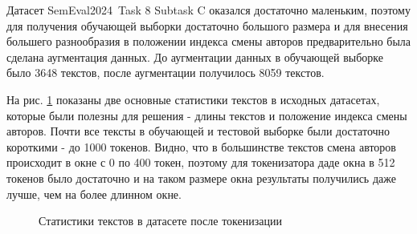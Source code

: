 Датасет SemEval2024~Task 8 Subtask C оказался достаточно маленьким, поэтому для получения обучающей выборки достаточно большого размера и для внесения большего разнообразия в положении индекса смены авторов предварительно была сделана аугментация данных. До аугментации данных в обучающей выборке было 3648 текстов, после аугментации получилось 8059 текстов.


На рис. \ref{statistics} показаны две основные статистики текстов в исходных датасетах, которые были полезны для решения - длины текстов и положение индекса смены авторов. Почти все тексты в обучающей и тестовой выборке были достаточно короткими - до 1000 токенов. Видно, что в большинстве текстов смена авторов происходит в окне с 0 по 400 токен, поэтому для токенизатора даде окна в 512 токенов было достаточно и на таком размере окна результаты получились даже лучше, чем на более длинном окне. 

 \begin{figure}[!htb]
    \centering
    \hfill%
    \caption{Статистики текстов в датасете после токенизации}
    \label{statistics}
\end{figure}

